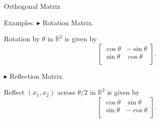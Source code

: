 \documentclass[aspectratio=169]{beamer}
\begin{document}
\begin{frame}{Orthogonal Matrix}

        \begin{block}{Examples.}
        {$\blacktriangleright$ Rotation Matrix.}
        \par Rotation by $\theta$ in $\mathbb{R}^2$ is given by 
        \begin{equation*}
            \left[ \begin{array}{cc} 
                \cos \theta & -\sin \theta \\ 
                \sin \theta &  \cos \theta \\ 
            \end{array} \right].
        \end{equation*}

        {$\blacktriangleright$ Reflection Matrix.} 
        \par Reflect $(x_1,x_2)$ across $\theta / 2$ in $\mathbb{R}^2$ is given by 
        \begin{equation*}
            \left[ \begin{array}{cc} 
                \cos \theta & \sin \theta \\ 
                \sin \theta & -\cos \theta \\ 
            \end{array} \right]. 
        \end{equation*}
        \end{block}

    \end{frame}
    
\end{document}
